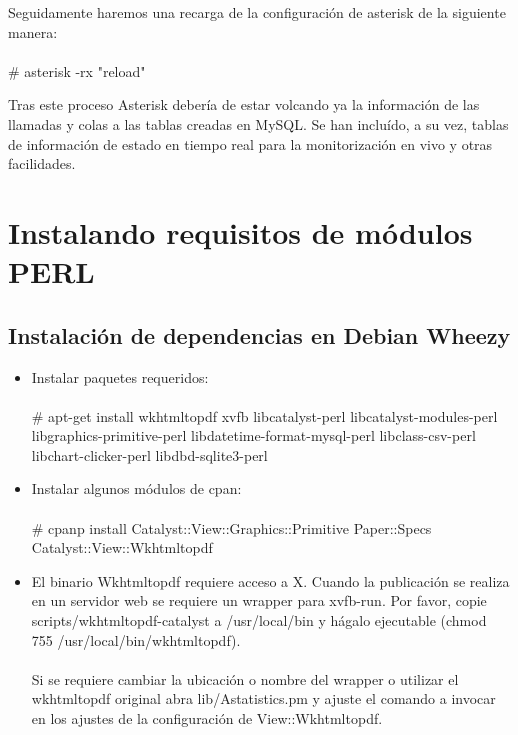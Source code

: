 \documentclass[spanish,12pt]{book}
\begin{document}
Seguidamente haremos una recarga de la configuración de asterisk de la siguiente manera:\\\\\# asterisk -rx "reload"

Tras este proceso Asterisk debería de estar volcando ya la información de las llamadas y colas a las tablas creadas en MySQL. Se han incluído, a su vez, tablas de información de estado en tiempo real para la monitorización en vivo y otras facilidades.

\section{Instalando requisitos de módulos PERL}
\subsection{Instalación de dependencias en Debian Wheezy}
\begin{itemize}
\item{Instalar paquetes requeridos:\\
\\
\# apt-get install wkhtmltopdf xvfb libcatalyst-perl libcatalyst-modules-perl libgraphics-primitive-perl libdatetime-format-mysql-perl libclass-csv-perl libchart-clicker-perl libdbd-sqlite3-perl}
\item{Instalar algunos módulos de cpan:\\
\\
\# cpanp install Catalyst::View::Graphics::Primitive Paper::Specs Catalyst::View::Wkhtmltopdf}

\item{El binario Wkhtmltopdf requiere acceso a X. Cuando la publicación se realiza en un servidor web se requiere un wrapper para xvfb-run. Por favor, copie scripts/wkhtmltopdf-catalyst a /usr/local/bin y hágalo ejecutable (chmod 755 /usr/local/bin/wkhtmltopdf).\\
\\
Si se requiere cambiar la ubicación o nombre del wrapper o utilizar el wkhtmltopdf original abra lib/Astatistics.pm y ajuste el comando a invocar en los ajustes de la configuración de View::Wkhtmltopdf.}
\end{itemize}
\end{document}
